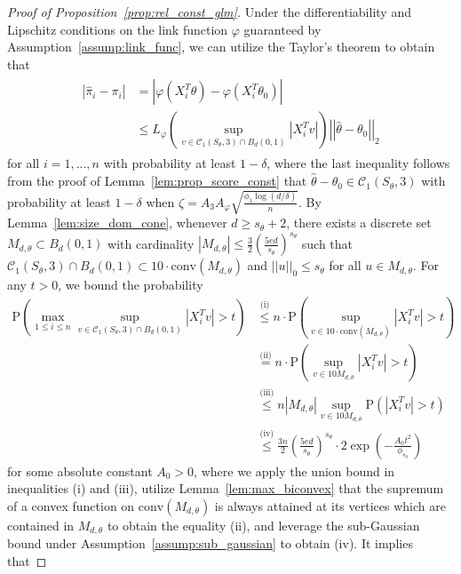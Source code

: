 \documentclass[ejsv2,noshowframe]{imsart}
\theoremstyle{plain}
\theoremstyle{definition}
\theoremstyle{remark}
\newcommand{\norm}[1]{\left|\left| #1 \right|\right|}
\renewcommand{\hat}{\widehat}
\begin{document}
\begin{proof}[Proof of Proposition~\ref{prop:rel_const_glm}]
	Under the differentiability and Lipschitz conditions on the link function $\varphi$ guaranteed by Assumption~\ref{assump:link_func}, we can utilize the Taylor's theorem to obtain that
	\begin{align}
		\label{rel_const_bnd}
		\begin{split}
			\left|\hat{\pi}_i -\pi_i\right| &= \left|\varphi(X_i^T\hat{\theta}) -\varphi(X_i^T\theta_0)\right|\\ 
			&\leq L_{\varphi} \left(\sup_{v\in \mathcal{C}_1(S_{\theta},3)\cap B_d(0,1)}\left|X_i^Tv\right|\right)\norm{\hat{\theta}-\theta_0}_2
		\end{split}
	\end{align}
	for all $i=1,...,n$ with probability at least $1-\delta$, where the last inequality follows from the proof of Lemma~\ref{lem:prop_score_const} that $\hat{\theta}-\theta_0 \in \mathcal{C}_1(S_{\theta},3)$ with probability at least $1-\delta$ when $\zeta =A_3 A_{\varphi} \sqrt{\frac{\phi_1\log(d/\delta)}{n}}$. By Lemma~\ref{lem:size_dom_cone}, whenever $d\geq s_{\theta}+2$, there exists a discrete set $M_{d,\theta} \subset B_d(0,1)$ with cardinality $|M_{d,\theta}| \leq \frac{3}{2} \left(\frac{5ed}{s_{\theta}} \right)^{s_{\theta}}$ such that $\mathcal{C}_1(S_{\theta},3) \cap B_d(0,1) \subset 10 \cdot \mathrm{conv}(M_{d,\theta})$ and $\norm{u}_0 \leq s_{\theta}$ for all $u\in M_{d,\theta}$. For any $t>0$, we bound the probability
	\begin{align*}
		\mathrm{P}\left(\max_{1\leq i \leq n}\sup_{v\in \mathcal{C}_1(S_{\theta},3)\cap B_d(0,1)}\left|X_i^Tv\right| > t \right) &\stackrel{\text{(i)}}{\leq} n\cdot \mathrm{P}\left(\sup_{v \in 10\cdot \mathrm{conv}(M_{d,\theta})} \left|X_i^Tv\right| > t \right)\\
		&\stackrel{\text{(ii)}}{=} n\cdot \mathrm{P}\left(\sup_{v \in 10M_{d,\theta}} \left|X_i^Tv\right| > t \right)\\
		&\stackrel{\text{(iii)}}{\leq} n|M_{d,\theta}| \sup_{v \in 10M_{d,\theta}} \mathrm{P}\left(\left|X_i^Tv\right| > t \right)\\
		&\stackrel{\text{(iv)}}{\leq} \frac{3n}{2}\left(\frac{5ed}{s_{\theta}}\right)^{s_{\theta}} \cdot 2\exp\left(-\frac{A_0 t^2}{\phi_{s_{\theta}}} \right)
	\end{align*}
	for some absolute constant $A_0>0$, where we apply the union bound in inequalities (i) and (iii), utilize Lemma~\ref{lem:max_biconvex} that the supremum of a convex function on $\mathrm{conv}(M_{d,\theta})$ is always attained at its vertices which are contained in $M_{d,\theta}$ to obtain the equality (ii), and leverage the sub-Gaussian bound under Assumption~\ref{assump:sub_gaussian} to obtain (iv). It implies that

\end{proof}
\end{document}
